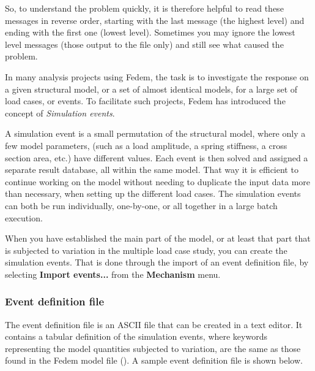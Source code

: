 So, to understand the problem quickly, it is therefore helpful to read these
messages in reverse order, starting with the last message (the highest level)
and ending with the first one (lowest level). Sometimes you may ignore the
lowest level messages (those output to the  file only)
and still see what caused the problem.



In many analysis projects using Fedem, the task is to investigate the response
on a given structural model, or a set of almost identical models,
for a large set of load cases, or events. To facilitate such projects,
Fedem has introduced the concept of {\sl Simulation events}.

A simulation event is a small permutation of the structural model, where only a
few model parameters, (such as a load amplitude, a spring stiffness, a cross
section area, etc.) have different values. Each event is then solved and
assigned a separate result database, all within the same model.
That way it is efficient to continue working on the model without needing to
duplicate the input data more than necessary, when setting up the different
load cases. The simulation events can both be run individually, one-by-one,
or all together in a large batch execution.



When you have established the main part of the model, or at least that part that
is subjected to variation in the multiple load case study, you can create the
simulation events. That is done through the import of an event definition file,
by selecting \textbf{Import events...} from the \textbf{Mechanism} menu.

\subsubsection{Event definition file}

The event definition file is an ASCII file that can be created in a text editor.
It contains a tabular definition of the simulation events, where keywords
representing the model quantities subjected to variation, are the same as those
found in the Fedem model file ().
A sample event definition file is shown below.

\vskip1mm\noindent
{}

